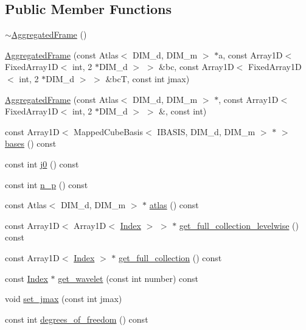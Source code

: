 \subsection*{Public Member Functions}
\begin{CompactItemize}
\item 
\hyperlink{classFrameTL_1_1AggregatedFrame_855b4a899b7f5845cd81029909bd8a19}{$\sim$AggregatedFrame} ()
\item 
\hyperlink{classFrameTL_1_1AggregatedFrame_653c47a2514e9099a56935f7b5819377}{AggregatedFrame} (const Atlas$<$ DIM\_\-d, DIM\_\-m $>$ $\ast$a, const Array1D$<$ FixedArray1D$<$ int, 2 $\ast$DIM\_\-d $>$ $>$ \&bc, const Array1D$<$ FixedArray1D$<$ int, 2 $\ast$DIM\_\-d $>$ $>$ \&bcT, const int jmax)
\item 
\hyperlink{classFrameTL_1_1AggregatedFrame_1d3c8966d03cbff2678aabd1d8012b3b}{AggregatedFrame} (const Atlas$<$ DIM\_\-d, DIM\_\-m $>$ $\ast$, const Array1D$<$ FixedArray1D$<$ int, 2 $\ast$DIM\_\-d $>$ $>$ \&, const int)
\item 
const Array1D$<$ MappedCubeBasis$<$ IBASIS, DIM\_\-d, DIM\_\-m $>$ $\ast$ $>$ \hyperlink{classFrameTL_1_1AggregatedFrame_6d03811d3fe631364a5ab927425c466e}{bases} () const 
\item 
const int \hyperlink{classFrameTL_1_1AggregatedFrame_546c96ce6177bacf02fb7bb9b2233d61}{j0} () const 
\item 
const int \hyperlink{classFrameTL_1_1AggregatedFrame_ca10ffd2b65d7e93c73f8acf4e158a64}{n\_\-p} () const 
\item 
const Atlas$<$ DIM\_\-d, DIM\_\-m $>$ $\ast$ \hyperlink{classFrameTL_1_1AggregatedFrame_ae0fa43f9093358f1ae2fdda963330a8}{atlas} () const 
\item 
const Array1D$<$ Array1D$<$ \hyperlink{classFrameTL_1_1FrameIndex}{Index} $>$ $>$ $\ast$ \hyperlink{classFrameTL_1_1AggregatedFrame_a497fe15ea8ef7cb83e639c94ba38143}{get\_\-full\_\-collection\_\-levelwise} () const 
\item 
const Array1D$<$ \hyperlink{classFrameTL_1_1FrameIndex}{Index} $>$ $\ast$ \hyperlink{classFrameTL_1_1AggregatedFrame_ed621690c6ba7da23caa1f50a34167a5}{get\_\-full\_\-collection} () const 
\item 
const \hyperlink{classFrameTL_1_1FrameIndex}{Index} $\ast$ \hyperlink{classFrameTL_1_1AggregatedFrame_4bbcc2a56f2c07a745b9b937109b5fde}{get\_\-wavelet} (const int number) const 
\item 
void \hyperlink{classFrameTL_1_1AggregatedFrame_d27b0ed0194ad64fcc7c804c9027de33}{set\_\-jmax} (const int jmax)
\item 
\hypertarget{classFrameTL_1_1AggregatedFrame_b0d3aeddd7c18d86d06744185dae81ff}{
const int \hyperlink{classFrameTL_1_1AggregatedFrame_b0d3aeddd7c18d86d06744185dae81ff}{degrees\_\-of\_\-freedom} () const }
\label{classFrameTL_1_1AggregatedFrame_b0d3aeddd7c18d86d06744185dae81ff}


\end{CompactItemize}
